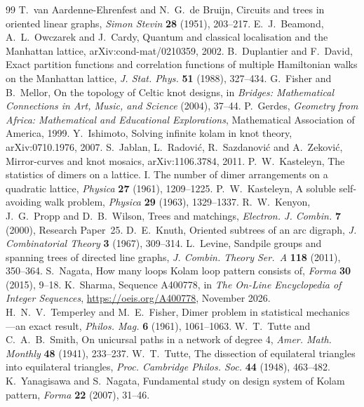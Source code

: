 \documentclass[11pt,a4paper]{amsart}
\theoremstyle{remark}
\begin{document}
\begin{thebibliography}{99}
 T.~van Aardenne-Ehrenfest and N.~G.~de Bruijn, Circuits and trees in oriented linear graphs,
\emph{Simon Stevin} \textbf{28} (1951), 203--217.
 E.~J.~Beamond, A.~L.~Owczarek and J.~Cardy, Quantum and classical localisation and the Manhattan
lattice, arXiv:cond-mat/0210359, 2002.
 B.~Duplantier and F.~David, Exact partition functions and correlation functions of multiple
Hamiltonian walks on the Manhattan lattice, \emph{J. Stat. Phys.} \textbf{51} (1988), 327--434.
 G.~Fisher and B.~Mellor, On the topology of Celtic knot designs, in \emph{Bridges: Mathematical
Connections in Art, Music, and Science} (2004), 37--44.
 P.~Gerdes, \emph{Geometry from Africa: Mathematical and Educational Explorations}, Mathematical
Association of America, 1999.
 Y.~Ishimoto, Solving infinite kolam in knot theory, arXiv:0710.1976, 2007.
 S.~Jablan, L.~Radovi\'c, R.~Sazdanovi\'c and A.~Zekovi\'c, Mirror-curves and knot mosaics,
arXiv:1106.3784, 2011.
 P.~W.~Kasteleyn, The statistics of dimers on a lattice. I. The number of dimer arrangements
on a quadratic lattice, \emph{Physica} \textbf{27} (1961), 1209--1225.
 P.~W.~Kasteleyn, A soluble self-avoiding walk problem, \emph{Physica} \textbf{29} (1963),
1329--1337.
 R.~W.~Kenyon, J.~G.~Propp and D.~B.~Wilson, Trees and matchings, \emph{Electron. J. Combin.}
\textbf{7} (2000), Research Paper~25.
 D.~E.~Knuth, Oriented subtrees of an arc digraph, \emph{J. Combinatorial Theory} \textbf{3} (1967),
309--314.
 L.~Levine, Sandpile groups and spanning trees of directed line graphs, \emph{J. Combin. Theory
Ser.~A} \textbf{118} (2011), 350--364.
 S.~Nagata, How many loops Kolam loop pattern consists of, \emph{Forma} \textbf{30} (2015), 9--18.
 K.~Sharma, Sequence A400778, in \emph{The On-Line Encyclopedia of Integer Sequences},
\url{https://oeis.org/A400778}, November 2026.
 H.~N.~V.~Temperley and M.~E.~Fisher, Dimer problem in statistical mechanics---an exact result,
\emph{Philos. Mag.} \textbf{6} (1961), 1061--1063.
 W.~T.~Tutte and C.~A.~B.~Smith, On unicursal paths in a network of degree 4, \emph{Amer. Math. Monthly}
\textbf{48} (1941), 233--237.
 W.~T.~Tutte, The dissection of equilateral triangles into equilateral triangles, \emph{Proc.
Cambridge Philos. Soc.} \textbf{44} (1948), 463--482.
 K.~Yanagisawa and S.~Nagata, Fundamental study on design system of Kolam pattern, \emph{Forma}
\textbf{22} (2007), 31--46.
\end{thebibliography}
\end{document}
